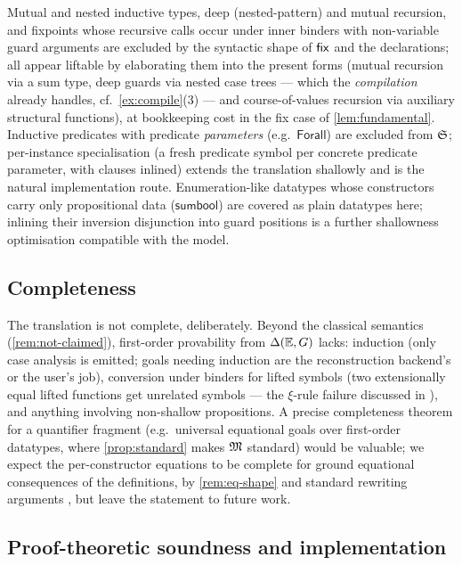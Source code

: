 Mutual and nested inductive types, deep (nested-pattern) and mutual
recursion, and fixpoints whose recursive calls occur under inner binders
with non-variable guard arguments are excluded by the syntactic shape of
$\mathsf{fix}$ and the declarations; all appear liftable by elaborating them
into the present forms (mutual recursion via a sum type, deep guards via
nested case trees --- which the \emph{compilation} already handles,
cf.\ \cref{ex:compile}(3) --- and course-of-values recursion via
auxiliary structural functions), at bookkeeping cost in the fix case of
\cref{lem:fundamental}.  Inductive predicates with predicate
\emph{parameters} (e.g.\ $\mathsf{Forall}$) are excluded from $\mathfrak{S}$;
per-instance specialisation (a fresh predicate symbol per concrete
predicate parameter, with clauses inlined) extends the translation
shallowly and is the natural implementation route.  Enumeration-like
datatypes whose constructors carry only propositional data
($\mathsf{sumbool}$) are covered as plain datatypes here; inlining
their inversion disjunction into guard positions is a further
shallowness optimisation compatible with the model.

\subsection{Completeness}
\label{sec:limitations-completeness}

The translation is not complete, deliberately.  Beyond the classical
semantics (\cref{rem:not-claimed}), first-order provability from $\Delta(\mathbb{E},G)$
lacks: induction (only case analysis is emitted; goals needing
induction are the reconstruction backend's or the user's job),
conversion under binders for lifted symbols (two extensionally equal
lifted functions get unrelated symbols --- the $\xi$-rule failure
discussed in \cite[Example 51]{Czajka2018}), and anything involving
non-shallow propositions.  A precise completeness theorem for a
quantifier fragment (e.g.\ universal equational goals over first-order
datatypes, where \cref{prop:standard} makes $\mathfrak{M}$ standard) would be
valuable; we expect the per-constructor equations to be complete for
ground equational consequences of the definitions, by
\cref{rem:eq-shape} and standard rewriting arguments
\cite{BaaderNipkow1998}, but leave the statement to future work.

\subsection{Proof-theoretic soundness and implementation}
\label{sec:limitations-proof-theoretic}

